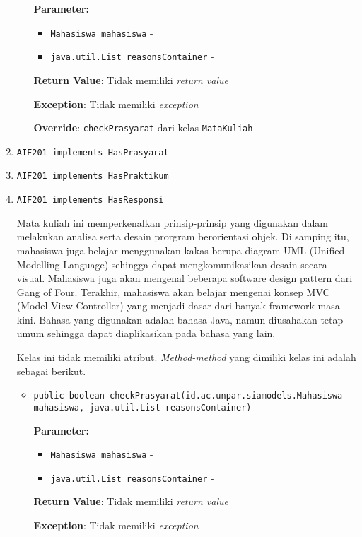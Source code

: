 \documentclass{article}
\begin{document}
\begin{enumerate}
\begin{itemize}
\textbf{Parameter:}
\begin{itemize}
\item \texttt{Mahasiswa mahasiswa} - 
\item \texttt{java.util.List reasonsContainer} - 
\end{itemize}
\textbf{Return Value}: Tidak memiliki \textit{return value}

\textbf{Exception}: Tidak memiliki \textit{exception}

\textbf{Override}: \texttt{checkPrasyarat} dari kelas \texttt{MataKuliah}

\end{itemize}
\item \texttt{AIF201 implements HasPrasyarat}

\item \texttt{AIF201 implements HasPraktikum}

\item \texttt{AIF201 implements HasResponsi}

Mata kuliah ini memperkenalkan prinsip-prinsip yang digunakan dalam 
 melakukan analisa serta desain prorgram berorientasi objek. Di samping itu, 
 mahasiswa juga belajar menggunakan kakas berupa diagram UML (Unified 
 Modelling Language) sehingga dapat mengkomunikasikan desain secara visual. 
 Mahasiswa juga akan mengenal beberapa software design pattern dari Gang of 
 Four. Terakhir, mahasiswa akan belajar mengenai konsep MVC 
 (Model-View-Controller) yang menjadi dasar dari banyak framework masa kini.
 Bahasa yang digunakan adalah bahasa Java, namun diusahakan tetap umum 
 sehingga dapat diaplikasikan pada bahasa yang lain.

Kelas ini tidak memiliki atribut. \textit{Method-method} yang dimiliki kelas ini adalah sebagai berikut.
\begin{itemize}
\item \texttt{public boolean checkPrasyarat(id.ac.unpar.siamodels.Mahasiswa mahasiswa, java.util.List reasonsContainer)}



\textbf{Parameter:}
\begin{itemize}
\item \texttt{Mahasiswa mahasiswa} - 
\item \texttt{java.util.List reasonsContainer} - 
\end{itemize}
\textbf{Return Value}: Tidak memiliki \textit{return value}

\textbf{Exception}: Tidak memiliki \textit{exception}


\end{itemize}
\end{enumerate}
\end{document}
